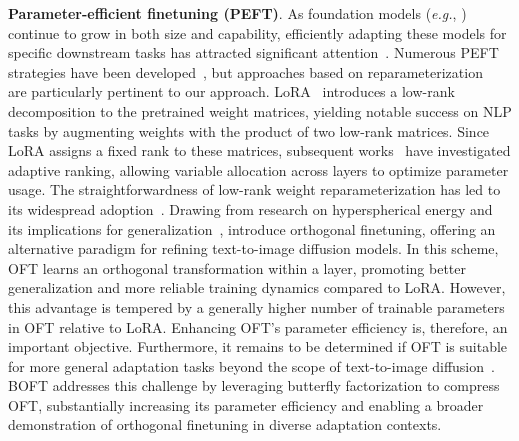 \textbf{Parameter-efficient finetuning (PEFT)}. As foundation models (\emph{e.g.}, \cite{brown2020language,radford2021learning,rombach2022high,kirillov2023segment}) continue to grow in both size and capability, efficiently adapting these models for specific downstream tasks has attracted significant attention~\cite{treviso2023efficient,ding2023parameter,lialin2023scaling}. Numerous PEFT strategies have been developed~\cite{houlsby2019parameter,aghajanyan2020intrinsic,hulora2022,edalati2022krona,wang2022adamix,gheini2021cross,zaken2022bitfit,guo2020parameter,sung2021training,ansell2022composable,lester2021power,li2021prefix,vu2022spot,he2021towards,mao2021unipelt,karimi2021compacter,liu2022few,sung2022lst,chen2022parameter,jia2022visual,chen2022adaptformer,zhang2022neural,jie2023fact,lian2022scaling,luo2023towards}, but approaches based on reparameterization~\cite{aghajanyan2020intrinsic,hulora2022,edalati2022krona} are particularly pertinent to our approach. LoRA~\cite{hulora2022} introduces a low-rank decomposition to the pretrained weight matrices, yielding notable success on NLP tasks by augmenting weights with the product of two low-rank matrices. Since LoRA assigns a fixed rank to these matrices, subsequent works~\cite{zhang2022adaptive,valipour2022dylora,zhang2023increlora} have investigated adaptive ranking, allowing variable allocation across layers to optimize parameter usage. The straightforwardness of low-rank weight reparameterization has led to its widespread adoption~\cite{dettmers2023qlora,zi2023delta,chavan2023one}. Drawing from research on hyperspherical energy and its implications for generalization~\cite{liu2018learning,liu2021orthogonal}, \cite{qiu2023controlling} introduce orthogonal finetuning, offering an alternative paradigm for refining text-to-image diffusion models. In this scheme, OFT learns an orthogonal transformation within a layer, promoting better generalization and more reliable training dynamics compared to LoRA. However, this advantage is tempered by a generally higher number of trainable parameters in OFT relative to LoRA. Enhancing OFT’s parameter efficiency is, therefore, an important objective. Furthermore, it remains to be determined if OFT is suitable for more general adaptation tasks beyond the scope of text-to-image diffusion~\cite{qiu2023controlling}. BOFT addresses this challenge by leveraging butterfly factorization to compress OFT, substantially increasing its parameter efficiency and enabling a broader demonstration of orthogonal finetuning in diverse adaptation contexts.

